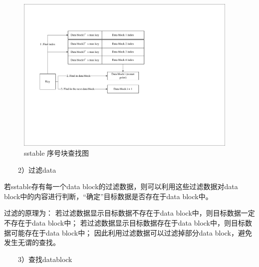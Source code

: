 \begin{enumerate}
\begin{enumerate}
\begin{figure}[H]
	\centering
	\includegraphics[width=0.95\textwidth]{pdf/index_block_find.pdf}
	\caption{sstable 序号块查找图}
	\label{sstable_index_block_find}
\end{figure}

\ \ \ \ 2）过滤data
	
	若sstable存有每一个data block的过滤数据，则可以利用这些过滤数据对data block中的内容进行判断，“确定”目标数据是否存在于data block中。

过滤的原理为：
若过滤数据显示目标数据不存在于data block中，则目标数据一定不存在于data block中；
若过滤数据显示目标数据存在于data block中，则目标数据可能存在于data block中；
因此利用过滤数据可以过滤掉部分data block，避免发生无谓的查找。


\ \ \ \ 3）查找datablock
	

\end{enumerate}
\end{enumerate}

